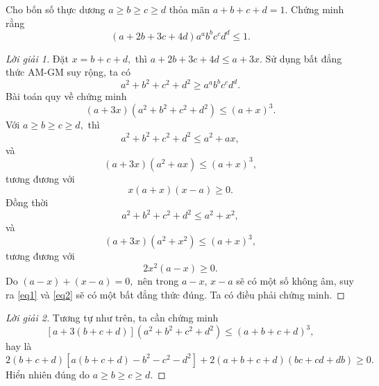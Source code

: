 \documentclass[12pt,a4paper]{book}
\begin{document}
\begin{bt}[IMO 2020]
Cho bốn số thực dương $a \ge b \ge c \ge d$ thỏa mãn $a+b+c+d=1.$ Chứng minh rằng
\[(a+2b+3c+4d)a^ab^bc^cd^d \leq 1.\]
\end{bt}

\begin{proof}[\pcolor Lời giải 1]
Đặt $x=b+c+d,$ thì $a + 2b + 3c + 4d \le a+3x.$ Sử dụng bất đẳng thức AM-GM suy rộng, ta có
\[a^2 + b^2 + c^2 + d^2 \geq a^ab^bc^cd^d.\]
Bài toán quy về chứng minh
\[(a+3x)(a^2 + b^2 + c^2 + d^2) \leq (a+x)^3.\]
Với $a \ge b \ge c \ge d,$ thì
\[a^2 + b^2 + c^2 + d^2 \le a^2+ax,\]
và
\[(a+3x)(a^2+ax) \leq (a + x)^3,\]
tương đương với
\begin{equation}\label{eq1}
x(a+x)(x-a) \ge 0.
\end{equation}
Đồng thời
\[a^2 + b^2 + c^2 + d^2 \le a^2+x^2,\]
và
\[(a+3x)(a^2+x^2) \leq (a+x)^3,\]
tương đương với
\begin{equation}\label{eq2}
2x^2(a-x) \ge 0.
\end{equation}
Do $(a-x)+(x-a)=0,$ nên trong $a-x,\,x-a$ sẽ có một số không âm, suy ra \eqref{eq1} và \eqref{eq2} sẽ có một bất đẳng thức đúng. Ta có điều phải chứng minh.
\end{proof}

\begin{proof}[\pcolor Lời giải 2]
Tương tự như trên, ta cần chứng minh
\[[a+3(b+c+d)](a^2 + b^2 + c^2 + d^2) \leq (a+b+c+d)^3,\]
hay là
\[2(b+c+d)\left[a(b+c+d)-b^2-c^2-d^2\right]+2(a+b+c+d)(bc+cd+db) \ge 0.\]
Hiển nhiên đúng do $a \ge b \ge c \ge d.$
\end{proof}
\end{document}

